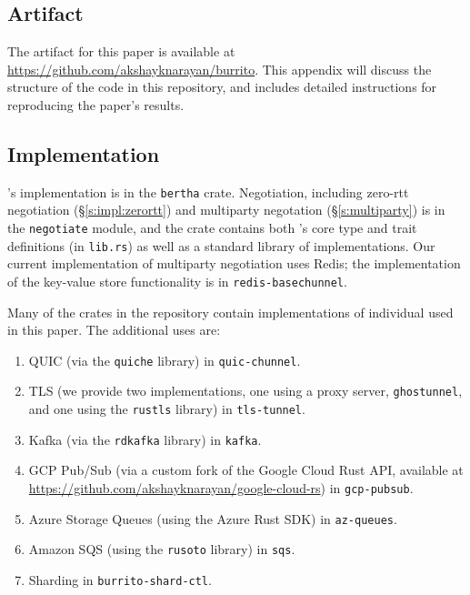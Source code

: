 \begin{appendix}
\clearpage
\section{\name Artifact}\label{app:artifact}
The artifact for this paper is available at \url{https://github.com/akshayknarayan/burrito}. This appendix will discuss the structure of the code in this repository, and includes detailed instructions for reproducing the paper's results.

\subsection{Implementation}

\name's implementation is in the \texttt{bertha} crate. Negotiation, including zero-rtt negotiation (\S\ref{s:impl:zerortt}) and multiparty negotation (\S\ref{s:multiparty}) is in the \texttt{negotiate} module, and the crate contains both \name's core type and trait definitions (in \texttt{lib.rs}) as well as a standard library of \tunnel implementations. Our current implementation of multiparty negotiation uses Redis; the implementation of the key-value store functionality is in \texttt{redis-basechunnel}.

Many of the crates in the repository contain implementations of individual \tunnels used in this paper.
The additional \tunnels \etlapp uses are:
\begin{enumerate}
    \item  QUIC (via the \texttt{quiche} library) in \texttt{quic-chunnel}.
    \item TLS (we provide two implementations, one using a proxy server, \texttt{ghostunnel}, and one using the \texttt{rustls} library) in \texttt{tls-tunnel}.
    \item Kafka (via the \texttt{rdkafka} library) in \texttt{kafka}.
    \item GCP Pub/Sub (via a custom fork of the Google Cloud Rust API, available at \url{https://github.com/akshayknarayan/google-cloud-rs}) in \texttt{gcp-pubsub}.
    \item Azure Storage Queues (using the Azure Rust SDK) in \texttt{az-queues}.
    \item Amazon SQS (using the \texttt{rusoto} library) in \texttt{sqs}.
    \item Sharding in \texttt{burrito-shard-ctl}.
\end{enumerate}


\end{appendix}
